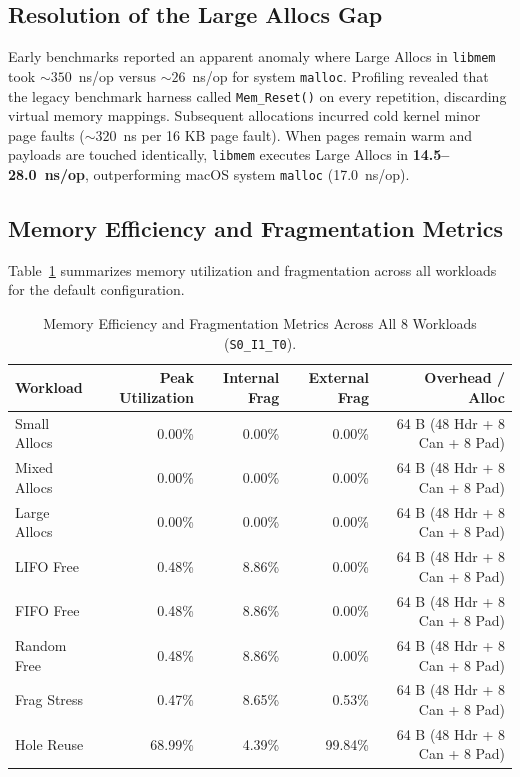 \documentclass[11pt,a4paper]{article}
\begin{document}
\subsection{Resolution of the Large Allocs Gap}
Early benchmarks reported an apparent anomaly where Large Allocs in \texttt{libmem} took $\sim 350$~ns/op versus $\sim 26$~ns/op for system \texttt{malloc}. Profiling revealed that the legacy benchmark harness called \texttt{Mem\_Reset()} on every repetition, discarding virtual memory mappings. Subsequent allocations incurred cold kernel minor page faults ($\sim 320$~ns per 16 KB page fault). When pages remain warm and payloads are touched identically, \texttt{libmem} executes Large Allocs in \textbf{14.5--28.0~ns/op}, outperforming macOS system \texttt{malloc} (17.0~ns/op).

\subsection{Memory Efficiency and Fragmentation Metrics}
Table~\ref{tab:efficiency} summarizes memory utilization and fragmentation across all workloads for the default configuration.

\begin{table}[htbp]
\centering
\caption{Memory Efficiency and Fragmentation Metrics Across All 8 Workloads (\texttt{S0\_I1\_T0}).}
\label{tab:efficiency}
\small
\begin{tabular}{lrrrr}
\toprule
\textbf{Workload} & \textbf{Peak Utilization} & \textbf{Internal Frag} & \textbf{External Frag} & \textbf{Overhead / Alloc} \\
\midrule
Small Allocs    & 0.00\% & 0.00\% & 0.00\% & 64 B (48 Hdr + 8 Can + 8 Pad) \\
Mixed Allocs    & 0.00\% & 0.00\% & 0.00\% & 64 B (48 Hdr + 8 Can + 8 Pad) \\
Large Allocs    & 0.00\% & 0.00\% & 0.00\% & 64 B (48 Hdr + 8 Can + 8 Pad) \\
LIFO Free       & 0.48\% & 8.86\% & 0.00\% & 64 B (48 Hdr + 8 Can + 8 Pad) \\
FIFO Free       & 0.48\% & 8.86\% & 0.00\% & 64 B (48 Hdr + 8 Can + 8 Pad) \\
Random Free     & 0.48\% & 8.86\% & 0.00\% & 64 B (48 Hdr + 8 Can + 8 Pad) \\
Frag Stress     & 0.47\% & 8.65\% & 0.53\% & 64 B (48 Hdr + 8 Can + 8 Pad) \\
Hole Reuse      & 68.99\% & 4.39\% & 99.84\% & 64 B (48 Hdr + 8 Can + 8 Pad) \\
\bottomrule
\end{tabular}
\end{table}
\end{document}
